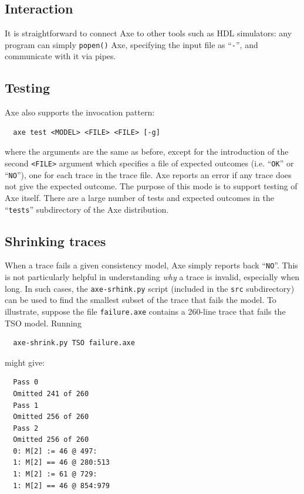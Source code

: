 \documentclass[11pt]{article}
\begin{document}
\subsection*{Interaction}

It is straightforward to connect Axe to other tools such as HDL
simulators: any program can simply \verb!popen()! Axe, specifying the
input file as ``\verb!-!'', and communicate with it via pipes.

\subsection*{Testing}

Axe also supports the invocation pattern:
\begin{verbatim}
  axe test <MODEL> <FILE> <FILE> [-g]
\end{verbatim}
\noindent where the arguments are the same as before, except for the
introduction of the
second \verb!<FILE>! argument which specifies a file of expected
outcomes (i.e. ``\verb!OK!'' or ``\verb!NO!''), one for each trace in the trace
file.  Axe reports an error if any trace does not give
the expected outcome.  The purpose of this mode is to support testing of
Axe itself.  There are a large number of tests and expected outcomes
in the ``\verb!tests!'' subdirectory of the Axe distribution.

\subsection*{Shrinking traces}

When a trace fails a given consistency model, Axe
simply reports back ``\verb!NO!''.  This is not particularly helpful
in understanding \emph{why} a trace is invalid,
especially when
long.  In such cases, the \verb!axe-srhink.py! script
(included in the \verb!src! subdirectory) can be used to find the
smallest subset of the trace that fails the model.
To illustrate, suppose the file \verb!failure.axe! contains a 260-line
trace that fails the TSO model.  Running
\begin{verbatim}
  axe-shrink.py TSO failure.axe
\end{verbatim}
might give:
\begin{verbatim}
  Pass 0
  Omitted 241 of 260         
  Pass 1
  Omitted 256 of 260         
  Pass 2
  Omitted 256 of 260         
  0: M[2] := 46 @ 497:
  1: M[2] == 46 @ 280:513
  1: M[2] := 61 @ 729:
  1: M[2] == 46 @ 854:979
\end{verbatim}
\end{document}
